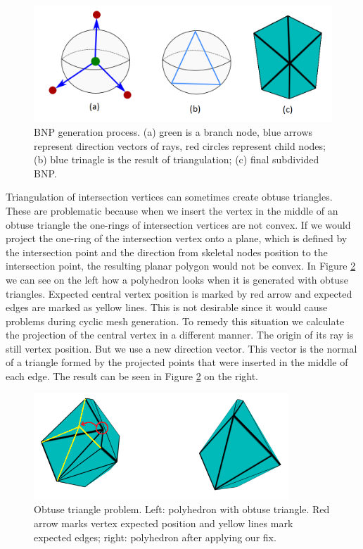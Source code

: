 \begin{figure}[h]
    \centering
    \includegraphics[width=\textwidth]{images/bnp_gen_ilu.png}
    \caption[BNP generation process]{BNP generation process. (a) green is a branch node, blue arrows represent direction vectors of rays, red circles represent child nodes; (b) blue trinagle is the result of triangulation; (c) final subdivided BNP.}
    \label{fig:bnp_gen_ilu}
\end{figure}

Triangulation of intersection vertices can sometimes create obtuse triangles. These are problematic because when we insert the vertex in the middle of an obtuse triangle the one-rings of intersection vertices are not convex. If we would project the one-ring of the intersection vertex onto a plane, which is defined by the intersection point and the direction from skeletal nodes position to the intersection point, the resulting planar polygon would not be convex. In Figure \ref{fig:obtus_tri_ilu} we can see on the left how a polyhedron looks when it is generated with obtuse triangles. Expected central vertex position is marked by red arrow and expected edges are marked as yellow lines. This is not desirable since it would cause problems during cyclic mesh generation. To remedy this situation we calculate the projection of the central vertex in a different manner. The origin of its ray is still vertex position. But we use a new direction vector. This vector is the normal of a triangle formed by the projected points that were inserted in the middle of each edge. The result can be seen in Figure \ref{fig:obtus_tri_ilu} on the right.

\begin{figure}[h]
    \centering
    \includegraphics[height=4cm]{images/obtuse_triangle_fix_ilu.png}
    \caption[Obtuse triangle problem]{Obtuse triangle problem. Left: polyhedron with obtuse triangle. Red arrow marks vertex expected position and yellow lines mark expected edges; right: polyhedron after applying our fix.}
    \label{fig:obtus_tri_ilu}
\end{figure}

